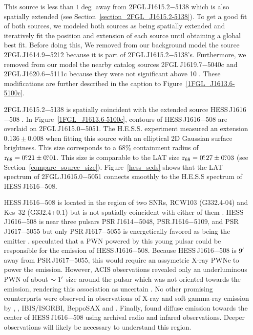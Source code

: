 \documentclass[12pt,preprint]{aastex}
\newcommand{\gev}{\text{GeV}\xspace}
\newcommand{\tev}{\text{TeV}\xspace}
\newcommand{\chandra}{\text{{\em Chandra}}\xspace}
\newcommand{\swiftxrt}{\text{{\em Swift}/XRT}\xspace}
\newcommand{\suzaku}{\text{{\em Suzaku}}\xspace}
\newcommand{\xmmnewton}{\text{{\em XMM-Newton}}\xspace}
\newcommand{\rsixeight}{{\ensuremath{\text{r}_{68}}}\xspace}
\newcommand{\hl}[1]{#1}
\begin{document}
This source is less than $1\deg$ away from 2FGL\,J1615.2$-$5138 which is
also spatially extended (see Section~\ref{section_2FGL_J1615.2-5138}).
To get a good fit of both sources, we modeled both sources as
being spatially extended and iteratively fit the position and extension
of each source until obtaining a global best fit.  Before doing this,
We removed from our background model the source 2FGL\,J1614.9$-$5212 because it is
part of 2FGL\,J1615.2$-$5138's. Furthermore, we removed from our model the nearby catalog
sources 2FGL\,J1619.7$-$5040c and 2FGL\,J1620.6$-$5111c because they were not
significant above 10 \gev.  These modifications are further described
in the caption to Figure~\ref{1FGL_J1613.6-5100c}.  

2FGL\,J1615.2$-$5138 is spatially coincident with the extended
\tev source HESS\,J1616$-$508 \citep{hess_plane_survey}.  In
Figure~\ref{1FGL_J1613.6-5100c}, contours of HESS\,J1616$-$508 are overlaid
on 2FGL\,J1615.0$-$5051.  The H.E.S.S. experiment measured an
extension $0.136\pm 0.008$ when fitting this source with an elliptical
2D Gaussian surface brightness.  This size corresponds to a 68\% containment
radius of $\rsixeight=0\fdg21\pm0\fdg01$. This size is comparable to the LAT
size $\rsixeight=0\fdg27\pm0\fdg03$ (see Section~\ref{compare_source_size}).
Figure~\ref{hess_seds} shows that the LAT spectrum of 2FGL\,J1615.0$-$5051
connects smoothly to the H.E.S.S spectrum of HESS\,J1616$-$508.

\hl{
HESS\,J1616$-$508 is located in the region of two SNRs, RCW103
(G332.4-04) and Kes~32 (G332.4+0.1) but is not spatially coincident
with either of them \citep{hess_plane_survey}.  HESS\,J1616$-$508 is near
three pulsars PSR\,J1614$-$5048, PSR\,J1616$-$5109, and PSR\,J1617$-$5055
but only PSR\,J1617$-$5055 is energetically favored as being the \tev
emitter \citep{discovery_of_PSR_J1617-5055,integral_HESS_J1616-508}.
\cite{hess_plane_survey} speculated that a PWN powered by this young
pulsar could be responsible for the emission of HESS\,J1616$-$508.
Because HESS\,J1616$-$508 is $9\mbox{$^\prime$}$ away from PSR\,J1617$-$5055, this would
require an assymetric X-ray PWNe to power the \tev emission. However,
\chandra ACIS observations revealed only an underluminous PWN of
about $\sim1\mbox{$^\prime$}$ size around the pulsar which was not oriented
towards the \tev emission, rendering this association as uncertain
\citep{discovery_of_pwn_for_PSR_J1617-5055}.  No other promising
counterparts were observed in observations of X-ray and soft gamma-ray
emission by \suzaku \citep{suzakzu_HESS_J1616-508}, \swiftxrt,
IBIS/ISGRBI, BeppoSAX and \xmmnewton \citep{integral_HESS_J1616-508}.
Finally, \cite{discovery_of_pwn_for_PSR_J1617-5055} found diffuse
emission towards the center of HESS\,J1616$-$508 using archival radio and
infared observations.  Deeper observations will likely be necessary to
understand this region.
}
\end{document}

